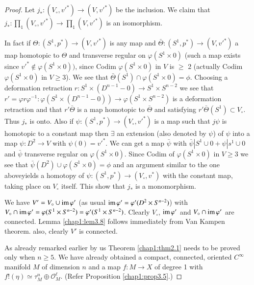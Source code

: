 \begin{proof}%
Let $j_*: (V_\circ, v'^*)\rightarrow (V, v'^* )$ be the inclusion. We claim
that $j_*: \prod_1 (V_\circ, v'^*) \rightarrow \prod_1(V, v'^*)$ is an
isomorphism.  
 
In fact if $\Theta: (S^1, p^*) \rightarrow (V, v'^*)$ is any map and 
$\bar{\Theta}: (S^1, p^* ) \rightarrow (V, v'^*)$ a map homotopic to
$\Theta$ and transverse regular on $\varphi (S^1 \times 0)$ (such a
map exists since $v'^* \notin \varphi (S^1 \times 0))$, since Codim
$\varphi (S^1 \times 0)$ in $V$ is $\geq$ 2 (actually Codim $\varphi
(S^1 \times 0)$ in $V \geq 3$). We see that $\bar{\Theta}(S^1) \cap
\varphi(S^1 \times 0) = \phi$. Choosing a deformation retraction $r:
S^1 \times (D^{n-1}-0 ) \rightarrow S^1\times S^{n-2}$ we see that $r'
= \varphi r \varphi ^{-1}: \varphi (S^1 \times (D^{n-1}-0))
\rightarrow \varphi (S^1 \times S^{n-2})$ is a deformation retraction
and that $r'\bar{\Theta}$ is a map  homotopic to $\bar{\Theta}$ and
satisfying $r' \bar{\Theta}(S^1) \subset V_\circ$. Thus $j_*$ is
onto. Also if $\psi : (S^1 ,p^*) \rightarrow (V_\circ, v'^*) $ is a map
such that $j \psi$ is homotopic to a constant map then $\exists$ an
extension (also denoted by $\psi$) of $\psi $ into a map $\psi: D^2
\rightarrow V $ with $\psi (0) = {v'}^*$. We can get a map
$\bar{\psi}$ with $\bar{\psi}| S^1 \cup 0 + \psi | s^1 \cup 0 $ and
$\bar{\psi}$ transverse regular on $\varphi (S^1\times 0 )$. Since
Codim of $\varphi (S^1 \times 0)$ in $V \geq 3$ we see that
$\bar{\psi}(D^2) \cup \varphi (S^1 \times 0 ) = \phi$ and an argument
similar to the one above\pageoriginale yields a homotopy of $\psi:
(S^1, p^*) \rightarrow (V_\circ , v^*) $ with the constant map, taking
place on $V_\circ$ itself. This show that $j_* $ is a monomorphism.   

 We have $V' = V_\circ \cup \operatorname{im} \varphi'$ (as usual $\operatorname{im} \varphi' =
 \varphi' (D^2 \times S^{n-2})$) with $V_\circ \cap \operatorname{im} \varphi' = 
 \varphi (S^1 \times S^{n-2}) = \varphi' (S^1 \times
 S^{n-2})$. Clearly $V_\circ$, $\operatorname{im} \varphi'$ and $V_\circ \cap \operatorname{im} \varphi'$
 are connected. Lemma \ref{chap1:lem3.8} follows immediately from Van Kampen
 theorem. also, clearly $V'$ is connected.  
 
 As already remarked earlier by us Theorem \ref{chap1:thm2.1} needs to be proved only
 when $n \geq 5$. We have already obtained a compact, connected,
 oriented $C^\infty$ manifold $M$ of dimension $n$ and a map $f: M
 \rightarrow X$ of degree 1 with $f! (\eta) \simeq \tau^n_M \oplus
 \mathscr{O}^\ell_M $. (Refer Proposition \ref{chap1:prop3.5}.)  
\end{proof}

